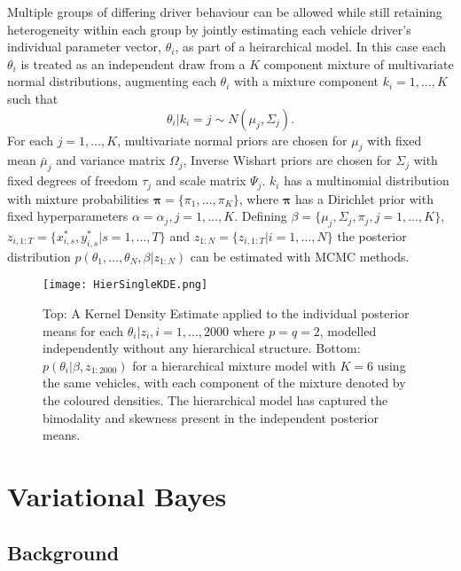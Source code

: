 \documentclass[12pt,a4paper]{article}\usepackage[]{graphicx}\usepackage[]{color}
\begin{document}
Multiple groups of differing driver behaviour can be allowed while still retaining heterogeneity within each group by jointly estimating each vehicle driver's individual parameter vector, $\theta_i$, as part of a heirarchical model. In this case each $\theta_i$ is treated as an independent draw from a $K$ component mixture of multivariate normal distributions, augmenting each $\theta_i$ with a mixture component $k_i = 1, \dots, K$ such that 
\begin{equation}
\theta_i | k_i = j \sim N(\mu_j, \Sigma_j).
\end{equation}
For each $j = 1, \dots, K$, multivariate normal priors are chosen for $\mu_j$ with fixed mean $\bar{\mu}_j$ and variance matrix $\Omega_j$, Inverse Wishart priors are chosen for $\Sigma_j$ with fixed degrees of freedom $\tau_j$ and scale matrix $\Psi_j$. $k_{i}$ has a multinomial distribution with mixture probabilities $\boldsymbol{\pi} = \{\pi_{1}, \dots, \pi_{K}\}$, where $\boldsymbol{\pi}$ has a Dirichlet prior with fixed hyperparameters $\alpha = \alpha_j, j = 1 , \dots, K$. Defining $\beta = \{\mu_j, \Sigma_j, \pi_j, j = 1, \dots, K\}$, $z_{i, 1:T} = \{x^*_{i, s}, y^*_{i, s} | s = 1, \dots, T\}$ and $z_{1:N} = \{z_{i, 1:T} | i = 1, \dots, N\}$ the posterior distribution $p(\theta_1, \dots, \theta_N, \beta | z_{1:N})$ can be estimated with MCMC methods.

\begin{figure}[ht]
\centering
\texttt{[image: HierSingleKDE.png]}
\caption{Top: A Kernel Density Estimate applied to the individual posterior means for each $\theta_i | z_i, i = 1, \dots, 2000$ where $p = q = 2$, modelled independently without any hierarchical structure. Bottom: $p(\theta_i | \beta, z_{1:2000})$ for a hierarchical mixture model with $K = 6$ using the same vehicles, with each component of the mixture denoted by the coloured densities. The hierarchical model has captured the bimodality and skewness present in the independent posterior means.}
\label{fig:HierSingleKDE}
\end{figure}

\section{Variational Bayes}

\subsection{Background}
\end{document}
